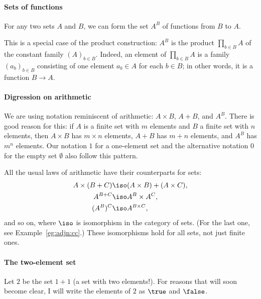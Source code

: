 \paragraph*{Sets of functions}  
%
%
%
For any two sets $A$ and $B$, we can form the set $A^B$%
%
%
 of functions from $B$ to $A$.  

This is a special case of the product construction: $A^B$ is the product
$\prod_{b \in B} A$ of the constant family $(A)_{b \in B}$.  Indeed, an
element of $\prod_{b \in B} A$ is a family $(a_b)_{b \in B}$ consisting of
one element $a_b \in A$ for each $b \in B$; in other words, it is a function
$B \to A$.

\paragraph*{Digression on arithmetic}%
\label{p:arith}
%
% 
We are using notation reminiscent of arithmetic: $A \times B$, $A + B$, and
$A^B$.  There is good reason for this: if $A$ is a finite set with $m$
elements and $B$ a finite set with $n$ elements, then $A \times B$ has $m
\times n$ elements, $A + B$ has $m + n$ elements, and $A^B$ has $m^n$
elements.  Our notation $1$ for a one-element set and the alternative
notation $0$ for the empty set $\emptyset$ also follow this pattern.

All the usual laws of arithmetic have their counterparts for sets:
% 
\begin{align*}
A \times (B + C)        &\iso (A \times B) + (A \times C),      \\
A^{B + C}               &\iso A^B \times A^C,                   \\
(A^B)^C                 &\iso A^{B \times C},
\end{align*}
% 
and so on, where $\iso$ is isomorphism in the category of sets.  (For the
last one, see Example~\ref{eg:adjn:cc}.)  These isomorphisms hold for all
sets, not just finite ones.

\paragraph*{The two-element set}  
%
%
Let $2$%
%
%
be the set $1 + 1$ (a set with two elements!).  For reasons that will soon
become clear, I will write the elements of $2$ as $\true$ and $\false$.

